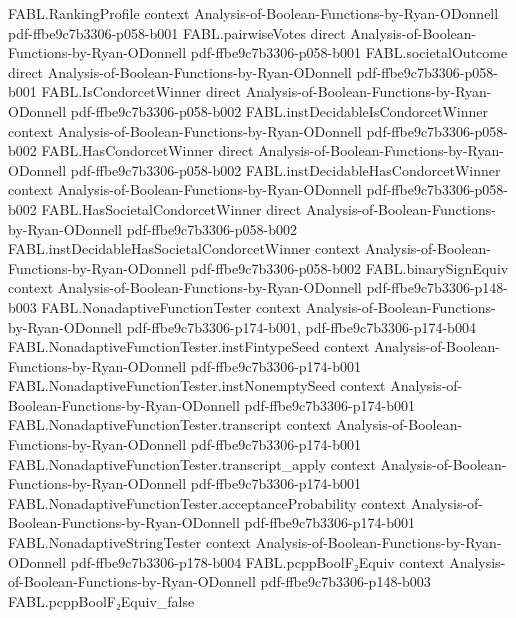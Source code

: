 \begin{theorem}
\proofstep
  {FABL.RankingProfile}
  {context}
  {Analysis-of-Boolean-Functions-by-Ryan-ODonnell}
  {pdf-ffbe9c7b3306-p058-b001}
\proofstep
  {FABL.pairwiseVotes}
  {direct}
  {Analysis-of-Boolean-Functions-by-Ryan-ODonnell}
  {pdf-ffbe9c7b3306-p058-b001}
\proofstep
  {FABL.societalOutcome}
  {direct}
  {Analysis-of-Boolean-Functions-by-Ryan-ODonnell}
  {pdf-ffbe9c7b3306-p058-b001}
\proofstep
  {FABL.IsCondorcetWinner}
  {direct}
  {Analysis-of-Boolean-Functions-by-Ryan-ODonnell}
  {pdf-ffbe9c7b3306-p058-b002}
\proofstep
  {FABL.instDecidableIsCondorcetWinner}
  {context}
  {Analysis-of-Boolean-Functions-by-Ryan-ODonnell}
  {pdf-ffbe9c7b3306-p058-b002}
\proofstep
  {FABL.HasCondorcetWinner}
  {direct}
  {Analysis-of-Boolean-Functions-by-Ryan-ODonnell}
  {pdf-ffbe9c7b3306-p058-b002}
\proofstep
  {FABL.instDecidableHasCondorcetWinner}
  {context}
  {Analysis-of-Boolean-Functions-by-Ryan-ODonnell}
  {pdf-ffbe9c7b3306-p058-b002}
\proofstep
  {FABL.HasSocietalCondorcetWinner}
  {direct}
  {Analysis-of-Boolean-Functions-by-Ryan-ODonnell}
  {pdf-ffbe9c7b3306-p058-b002}
\proofstep
  {FABL.instDecidableHasSocietalCondorcetWinner}
  {context}
  {Analysis-of-Boolean-Functions-by-Ryan-ODonnell}
  {pdf-ffbe9c7b3306-p058-b002}
\proofstep
  {FABL.binarySignEquiv}
  {context}
  {Analysis-of-Boolean-Functions-by-Ryan-ODonnell}
  {pdf-ffbe9c7b3306-p148-b003}
\proofstep
  {FABL.NonadaptiveFunctionTester}
  {context}
  {Analysis-of-Boolean-Functions-by-Ryan-ODonnell}
  {pdf-ffbe9c7b3306-p174-b001,
    pdf-ffbe9c7b3306-p174-b004}
\proofstep
  {FABL.NonadaptiveFunctionTester.instFintypeSeed}
  {context}
  {Analysis-of-Boolean-Functions-by-Ryan-ODonnell}
  {pdf-ffbe9c7b3306-p174-b001}
\proofstep
  {FABL.NonadaptiveFunctionTester.instNonemptySeed}
  {context}
  {Analysis-of-Boolean-Functions-by-Ryan-ODonnell}
  {pdf-ffbe9c7b3306-p174-b001}
\proofstep
  {FABL.NonadaptiveFunctionTester.transcript}
  {context}
  {Analysis-of-Boolean-Functions-by-Ryan-ODonnell}
  {pdf-ffbe9c7b3306-p174-b001}
\proofstep
  {FABL.NonadaptiveFunctionTester.transcript_apply}
  {context}
  {Analysis-of-Boolean-Functions-by-Ryan-ODonnell}
  {pdf-ffbe9c7b3306-p174-b001}
\proofstep
  {FABL.NonadaptiveFunctionTester.acceptanceProbability}
  {context}
  {Analysis-of-Boolean-Functions-by-Ryan-ODonnell}
  {pdf-ffbe9c7b3306-p174-b001}
\proofstep
  {FABL.NonadaptiveStringTester}
  {context}
  {Analysis-of-Boolean-Functions-by-Ryan-ODonnell}
  {pdf-ffbe9c7b3306-p178-b004}
\proofstep
  {FABL.pcppBoolF₂Equiv}
  {context}
  {Analysis-of-Boolean-Functions-by-Ryan-ODonnell}
  {pdf-ffbe9c7b3306-p148-b003}
\proofstep
  {FABL.pcppBoolF₂Equiv_false}

\end{theorem}
